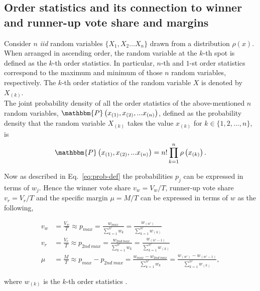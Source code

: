 \documentclass[reprint, pre, twocolumn, aps, showpacs, superscriptaddress]{revtex4-2}
\begin{document}
\subsection{Order statistics and its connection to winner and runner-up vote share and margins}
\noindent Consider $n$ \emph{iid} random variables $\{X_1, X_2 \dots X_n\}$ drawn from a distribution $\rho(x)$. When arranged in ascending order, the random variable at the $k$-th spot is defined as the $k$-th order statistics. In particular, $n$-th and $1$-st order statistics correspond to the maximum and minimum of those $n$ random variables, respectively. The $k$-th order statistics of the random variable $X$ is denoted by $X_{(k)}$.\\

\noindent The joint probability density of all the order statistics of the above-mentioned $n$ random variables, $\mathbbm{P}\left(x_{(1)}, x_{(2)}, ... x_{(n)}\right)$, defined as the probability density that the random variable $X_{(k)}$ takes the value $x_{(k)}$ for $k \in \{ 1, 2, \dots, n\}$, is
\begin{equation}
    \mathbbm{P}\left(x_{(1)}, x_{(2)}, ... x_{(n)}\right) = n!\prod_{k=1}^{n}\rho\left(x_{(k)}\right).
\end{equation}

\noindent Now as described in Eq.~\ref{eq:prob-def} the probabilities $p_j$ can be expressed in terms of $w_j$. Hence the winner vote share $v_w = V_w / T$, runner-up vote share $v_r = V_r / T$ and the specific margin $\mu = M / T$ can be expressed in terms of $w$ as the following,
\begin{center}
\begin{align}
    v_w &= \frac{V_w}{T} \approx p_{max} = \frac{w_{max}}{\sum_{k = 1}^{n^c}w_{k}} = \frac{w_{(n^c)}}{\sum_{k = 1}^{n^c}w_{(k)}}\\
    \label{eq:v_w}
    v_r &= \frac{V_r}{T} \approx p_{2nd\: max} = \frac{w_{2nd\:max}}{\sum_{k = 1}^{n^c}w_{k}} = \frac{w_{(n^c - 1)}}{\sum_{k = 1}^{n^c}w_{(k)}}\\
    \label{eq:v_r}
    \mu &= \frac{M}{T} \approx p_{max} - p_{2nd\: max} = \frac{w_{max} - w_{2nd\:max}}{\sum_{k = 1}^{n^c}w_{k}} = \frac{w_{(n^c)} - w_{(n^c - 1)}}{\sum_{k = 1}^{n^c}w_{(k)}},
\end{align}
\end{center}
where $w_{(k)}$ is the $k$-th order statistics \cite{BarBalNag2008}.
\end{document}
